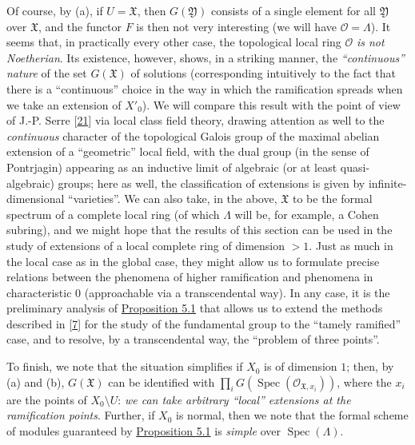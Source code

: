 \documentclass{article}
\theoremstyle{definition}
\theoremstyle{definition}
\theoremstyle{definition}
\theoremstyle{definition}
\theoremstyle{remark}
\begin{document}
Of course, by (a), if \(U={\mathfrak{X}}\), then \(G({\mathfrak{Y}})\) consists of a single element for all \({\mathfrak{Y}}\) over \({\mathfrak{X}}\), and the functor \(F\) is then not very interesting (we will have \({\mathscr{O}}=\Lambda\)).
It seems that, in practically every other case, the topological local ring \({\mathscr{O}}\) \emph{is not Noetherian}.
Its existence, however, shows, in a striking manner, the \emph{``continuous'' nature} of the set \(G({\mathfrak{X}})\) of solutions (corresponding intuitively to the fact that there is a ``continuous'' choice in the way in which the ramification spreads when we take an extension of \(X'_0\)).
We will compare this result with the point of view of J.-P. Serre {[}\protect\hyperlink{ref-Ser1958}{21}{]} via local class field theory, drawing attention as well to the \emph{continuous} character of the topological Galois group of the maximal abelian extension of a ``geometric'' local field, with the dual group (in the sense of Pontrjagin) appearing as an inductive limit of algebraic (or at least quasi-algebraic) groups;
here as well, the classification of extensions is given by infinite-dimensional ``varieties''.
We can also take, in the above, \({\mathfrak{X}}\) to be the formal spectrum of a complete local ring (of which \(\Lambda\) will be, for example, a Cohen subring), and we might hope that the results of this section can be used in the study of extensions of a local complete ring of dimension \(>1\).
Just as much in the local case as in the global case, they might allow us to formulate precise relations between the phenomena of higher ramification and phenomena in characteristic \(0\) (approachable via a transcendental way).
In any case, it is the preliminary analysis of \protect\hyperlink{fga-3-ii-section-C.5-proposition-5.1}{Proposition 5.1} that allows us to extend the methods described in {[}\protect\hyperlink{ref-Gro1958a}{7}{]} for the study of the fundamental group to the ``tamely ramified'' case, and to resolve, by a transcendental way, the ``problem of three points''.

To finish, we note that the situation simplifies if \(X_0\) is of dimension \(1\);
then, by (a) and (b), \(G({\mathfrak{X}})\) can be identified with \(\prod_i G(\operatorname{Spec}({\mathscr{O}}_{{\mathfrak{X}},x_i}))\), where the \(x_i\) are the points of \(X_0\setminus U\):
\emph{we can take arbitrary ``local'' extensions at the ramification points}.
Further, if \(X_0\) is normal, then we note that the formal scheme of modules guaranteed by \protect\hyperlink{fga-3-ii-section-C.5-proposition-5.1}{Proposition 5.1} is \emph{simple} over \(\operatorname{Spec}(\Lambda)\).
\end{document}
